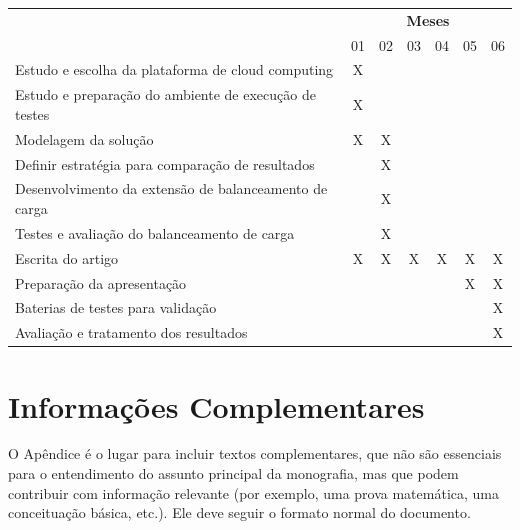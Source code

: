 \documentclass[twoside,english,brazilian]{UNISINOSmonografia}
\begin{document}
\begin{tabular}{|l|c|c|c|c|c|c|}\hline
 & \multicolumn{6}{c|}{\textbf{Meses}}\\ \cline{2-7}
\raisebox{1.5ex}{\textbf{Etapa}} & 01 & 02 & 03 & 04 & 05 & 06 										\\ \hline

Estudo e escolha da plataforma de cloud computing 						& X &   &   &   &   &		  	\\ \hline
Estudo e preparação do ambiente de execução de testes            		& X &   &   &   &   & 			\\ \hline
Modelagem da solução			 										& X & X &   &   &   &			\\ \hline
Definir estratégia para comparação de resultados						&   & X &   &   &   & 			\\ \hline
Desenvolvimento da extensão de balanceamento de carga					& 	& X &	&   &   &			\\ \hline
Testes e avaliação do balanceamento de carga							& 	& X & 	& 	& 	&  		   \\ \hline
Escrita do artigo														& X	& X & X & X & X & X			\\ \hline
Preparação da apresentação												& 	&   &   &   & X & X			\\ \hline
Baterias de testes para validação 										& 	& 	& 	& 	& 	& X 	   \\ \hline
Avaliação e tratamento dos resultados									& 	& 	& 	& 	& 	& X 	   \\ \hline

\end{tabular} 

\label{t_cronograma}



\appendix
\chapter{Informações Complementares}

O Apêndice é o lugar para incluir textos complementares, que não são essenciais para o entendimento do assunto principal da monografia, mas que podem contribuir com informação relevante (por exemplo, uma prova matemática, uma conceituação básica, etc.).  Ele deve seguir o formato normal do documento.
\end{document}

